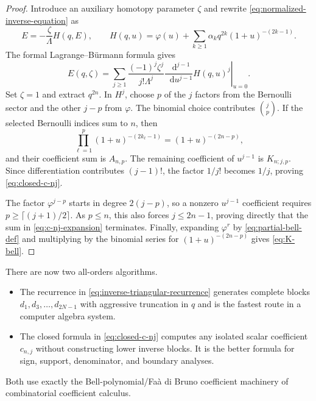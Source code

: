 \documentclass[11pt,a4paper,oneside]{article}
\theoremstyle{plain}
\theoremstyle{definition}
\theoremstyle{remark}
\newcommand{\dd}{\mathop{}\!\mathrm d}
\begin{document}
\begin{proof}
Introduce an auxiliary homotopy parameter $\zeta$ and rewrite
\cref{eq:normalized-inverse-equation} as
\begin{equation}
 E=-\frac{\zeta}{\Lambda}H(q,E),
 \qquad
 H(q,u)=\varphi(u)+
 \sum_{k\ge1}\alpha_kq^{2k}(1+u)^{-(2k-1)}.
 \label{eq:homotopy-equation}
\end{equation}
The formal Lagrange--B\"urmann formula gives
\begin{equation}
 E(q,\zeta)=\sum_{j\ge1}\frac{(-1)^j\zeta^j}{j!\Lambda^j}
 \left.\frac{\dd^{j-1}}{\dd u^{j-1}}H(q,u)^j\right|_{u=0}.
 \label{eq:LB-homotopy}
\end{equation}
Set $\zeta=1$ and extract $q^{2n}$.  In $H^j$, choose $p$ of the $j$
factors from the Bernoulli sector and the other $j-p$ from $\varphi$.
The binomial choice contributes $\binom jp$.  If the selected Bernoulli
indices sum to $n$, then
\[
 \prod_{\ell=1}^p(1+u)^{-(2k_\ell-1)}
 =(1+u)^{-(2n-p)},
\]
and their coefficient sum is $A_{n,p}$.  The remaining coefficient of
$u^{j-1}$ is $K_{n;j,p}$.  Since differentiation contributes $(j-1)!$, the
factor $1/j!$ becomes $1/j$, proving \cref{eq:closed-c-nj}.

The factor $\varphi^{j-p}$ starts in degree $2(j-p)$, so a nonzero
$u^{j-1}$ coefficient requires $p\ge\lceil(j+1)/2\rceil$.  As $p\le n$, this
also forces $j\le2n-1$, proving directly that the sum in
\cref{eq:c-nj-expansion} terminates.  Finally, expanding $\varphi^r$ by
\cref{eq:partial-bell-def} and multiplying by the binomial series for
$(1+u)^{-(2n-p)}$ gives \cref{eq:K-bell}.
\end{proof}

\begin{methodbox}
There are now two all-orders algorithms.
\begin{itemize}
\item The recurrence in \cref{eq:inverse-triangular-recurrence}
      generates complete blocks $d_1,d_3,\ldots,d_{2N-1}$ with aggressive
      truncation in $q$ and is the fastest route in a computer algebra system.
\item The closed formula in \cref{eq:closed-c-nj} computes any isolated scalar
      coefficient $c_{n,j}$ without constructing lower inverse blocks.  It is
      the better formula for sign, support, denominator, and boundary analyses.
\end{itemize}
Both use exactly the Bell-polynomial/Fa\`a di Bruno coefficient machinery of
combinatorial coefficient calculus.
\end{methodbox}
\end{document}
